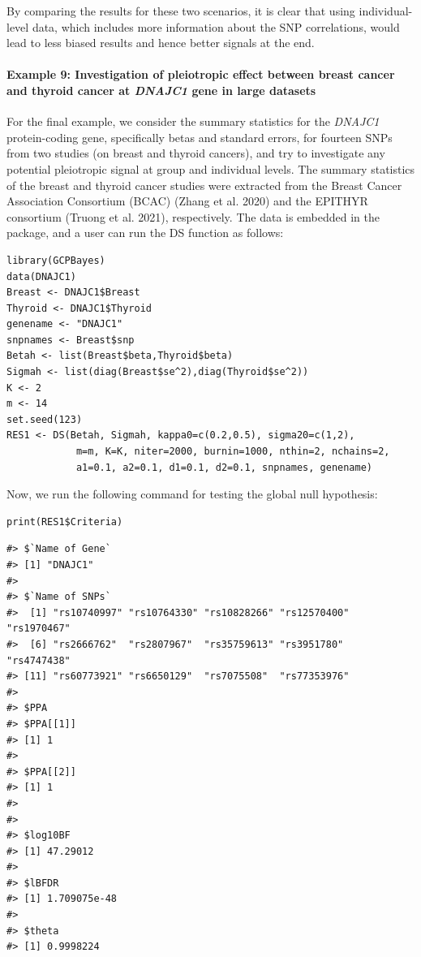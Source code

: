 By comparing the results for these two scenarios, it is clear that using individual-level data,
which includes more information about the SNP correlations,
would lead to less biased results and hence better signals at the end.

\hypertarget{example-9-investigation-of-pleiotropic-effect-between-breast-cancer-and-thyroid-cancer-at-dnajc1-gene-in-large-datasets}{%
\paragraph{\texorpdfstring{Example 9: Investigation of pleiotropic effect between breast cancer and thyroid cancer at \emph{DNAJC1} gene in large datasets}{Example 9: Investigation of pleiotropic effect between breast cancer and thyroid cancer at DNAJC1 gene in large datasets}}\label{example-9-investigation-of-pleiotropic-effect-between-breast-cancer-and-thyroid-cancer-at-dnajc1-gene-in-large-datasets}}

For the final example, we consider the summary statistics for the \emph{DNAJC1} protein-coding gene, specifically betas and standard errors, for fourteen SNPs from two studies (on breast and thyroid cancers), and try to investigate any potential pleiotropic signal at group and individual levels. The summary statistics of the breast and thyroid cancer studies were extracted from the Breast Cancer Association Consortium (BCAC) (Zhang et al. 2020) and the EPITHYR consortium (Truong et al. 2021), respectively.
The data is embedded in the  package, and a user can run the DS function as follows:

\begin{verbatim}
library(GCPBayes)
data(DNAJC1)
Breast <- DNAJC1$Breast
Thyroid <- DNAJC1$Thyroid
genename <- "DNAJC1"
snpnames <- Breast$snp
Betah <- list(Breast$beta,Thyroid$beta)
Sigmah <- list(diag(Breast$se^2),diag(Thyroid$se^2))
K <- 2
m <- 14
set.seed(123)
RES1 <- DS(Betah, Sigmah, kappa0=c(0.2,0.5), sigma20=c(1,2),
            m=m, K=K, niter=2000, burnin=1000, nthin=2, nchains=2,
            a1=0.1, a2=0.1, d1=0.1, d2=0.1, snpnames, genename)
\end{verbatim}

Now, we run the following command for testing the global null hypothesis:

\begin{verbatim}
print(RES1$Criteria)
\end{verbatim}

\begin{verbatim}
#> $`Name of Gene`
#> [1] "DNAJC1"
#> 
#> $`Name of SNPs`
#>  [1] "rs10740997" "rs10764330" "rs10828266" "rs12570400" "rs1970467" 
#>  [6] "rs2666762"  "rs2807967"  "rs35759613" "rs3951780"  "rs4747438" 
#> [11] "rs60773921" "rs6650129"  "rs7075508"  "rs77353976"
#> 
#> $PPA
#> $PPA[[1]]
#> [1] 1
#> 
#> $PPA[[2]]
#> [1] 1
#> 
#> 
#> $log10BF
#> [1] 47.29012
#> 
#> $lBFDR
#> [1] 1.709075e-48
#> 
#> $theta
#> [1] 0.9998224
\end{verbatim}

